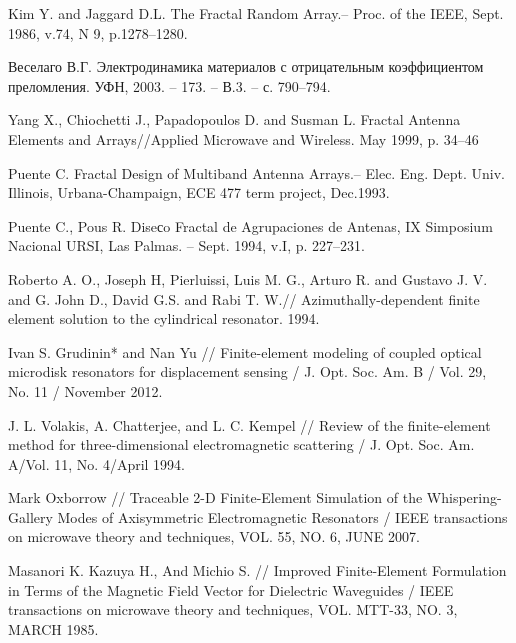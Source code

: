 \documentclass[%
specialist,  %
subf,        %
href,        %
colorlinks,  %
]{disser}
\begin{document}

\clearpage


%



\newpage
\appendix




\begin{thebibliography}{99}	
  Kim Y. and Jaggard D.L. The Fractal Random Array.– Proc. of the IEEE, Sept. 1986, v.74, N 9, p.1278–1280.
	
 Веселаго В.Г. Электродинамика материалов с отрицательным коэффициентом преломления. УФН, 2003. – 173. – В.3. – с. 790–794. 
	
 Yang X., Chiochetti J., Papadopoulos D. and Susman L. Fractal Antenna Elements and Arrays//Applied Microwave and Wireless. May 1999, p. 34–46
	
  Puente C. Fractal Design of Multiband Antenna Arrays.– Elec. Eng. Dept. Univ. Illinois, Urbana-Champaign, ECE 477 term project, Dec.1993.
	
 Puente C., Pous R. Diseсo Fractal de Agrupaciones de Antenas, IX Simposium Nacional URSI, Las Palmas. – Sept. 1994, v.I, p. 227–231.
	
 Roberto A. O., Joseph H, Pierluissi, Luis M. G., Arturo R. and Gustavo J. V. and G. John D., David G.S. and Rabi T. W.// Azimuthally-dependent finite element solution to the cylindrical resonator. 1994.
	
  Ivan S. Grudinin* and Nan Yu // Finite-element modeling of coupled optical microdisk resonators for displacement sensing / J. Opt. Soc. Am. B / Vol. 29, No. 11 / November 2012.
	
	
 J. L. Volakis, A. Chatterjee, and L. C. Kempel // Review of the finite-element method for three-dimensional electromagnetic scattering / J. Opt. Soc. Am. A/Vol. 11, No. 4/April 1994.
	
	
 Mark Oxborrow // Traceable 2-D Finite-Element Simulation of the Whispering-Gallery Modes of Axisymmetric Electromagnetic Resonators / IEEE transactions on microwave theory and techniques, VOL. 55, NO. 6, JUNE 2007.
	
	
 Masanori K. Kazuya H., And Michio S. // Improved Finite-Element Formulation in Terms of the Magnetic Field Vector for Dielectric Waveguides / IEEE transactions on microwave theory and techniques, VOL. MTT-33, NO. 3, MARCH 1985.


\end{thebibliography}
\end{document}
